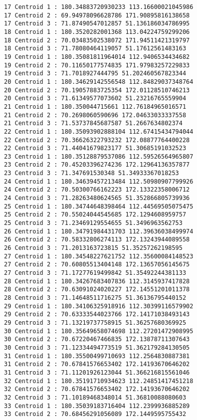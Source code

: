 \documentclass[11pt]{article}
\begin{document}
\begin{Verbatim}[commandchars=\\\{\}]
17 Centroid 1 : 180.34883720930233 113.16600021045986
17 Centroid 2 : 69.94978096628786 171.90895816138658
17 Centroid 3 : 71.87490547012857 51.136186034786995
18 Centroid 1 : 180.3520282001368 113.04224759299206
18 Centroid 2 : 70.03483502538072 171.94511421319797
18 Centroid 3 : 71.78080464119057 51.17612561483163
19 Centroid 1 : 180.35081811964014 112.9406534434682
19 Centroid 2 : 70.11650177574835 171.97983257229833
19 Centroid 3 : 71.7018927444795 51.202460567823344
20 Centroid 1 : 180.34629142556548 112.84829037348764
20 Centroid 2 : 70.19057883725354 172.01128510746213
20 Centroid 3 : 71.61349577073602 51.23216765559904
21 Centroid 1 : 180.350044715661 112.76184965016571
21 Centroid 2 : 70.2698060590696 172.04633033337558
21 Centroid 3 : 71.53737845687587 51.2667634802374
22 Centroid 1 : 180.35093902888104 112.67415434794044
22 Centroid 2 : 70.36626322793232 172.08877764400228
22 Centroid 3 : 71.44041679823177 51.30685191032523
23 Centroid 1 : 180.35128879537086 112.59526564965807
23 Centroid 2 : 70.45203396274236 172.12964136357877
23 Centroid 3 : 71.347691530348 51.34933367018253
24 Centroid 1 : 180.34639457213484 112.50980907799926
24 Centroid 2 : 70.50300766162223 172.13322358006712
24 Centroid 3 : 71.28263480624565 51.352866805739936
25 Centroid 1 : 180.34744648398464 112.44569505075475
25 Centroid 2 : 70.55024044545685 172.1294608959757
25 Centroid 3 : 71.23469129554655 51.3496963562753
26 Centroid 1 : 180.34791984431703 112.39636038499974
26 Centroid 2 : 70.58332806274113 172.13243944089558
26 Centroid 3 : 71.2013163723815 51.35257262198595
27 Centroid 1 : 180.34548227621752 112.35600084148523
27 Centroid 2 : 70.60805513404148 172.13657056145675
27 Centroid 3 : 71.17277619499842 51.35492244381133
28 Centroid 1 : 180.34267683407836 112.3145937417828
28 Centroid 2 : 70.63091024020227 172.14551201011378
28 Centroid 3 : 71.14648511716275 51.36136795440152
29 Centroid 1 : 180.34106325918916 112.30399116579902
29 Centroid 2 : 70.63333544023766 172.14171038493143
29 Centroid 3 : 71.13219737758915 51.36257680369925
30 Centroid 1 : 180.35649658074698 112.27201472908995
30 Centroid 2 : 70.67220467466835 172.13878711307643
30 Centroid 3 : 71.12334494773519 51.362179284130505
31 Centroid 1 : 180.35500499710693 112.2564830887381
31 Centroid 2 : 70.67841576653402 172.14193670646202
31 Centroid 3 : 71.11201926123044 51.366216815561046
32 Centroid 1 : 180.35191710934623 112.24851417451218
32 Centroid 2 : 70.67841576653402 172.14193670646202
32 Centroid 3 : 71.10189468348014 51.36810088080603
33 Centroid 1 : 180.35039183716404 112.2399936885289
33 Centroid 2 : 70.68456291056089 172.1449595755432

\end{Verbatim}
\end{document}
